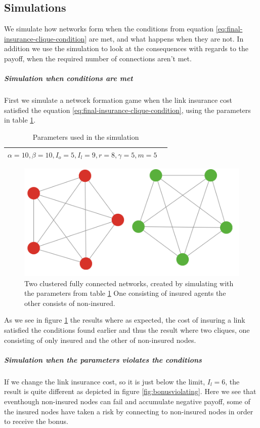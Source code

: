 \subsection{Simulations}
We simulate how networks form when the conditions from equation \ref{eq:final-insurance-clique-condition} are met, and what happens when they are not. In addition we use the simulation to look at the consequences with regards to the payoff, when the required number of connections aren't met. 

\subparagraph{Simulation when conditions are met}
First we simulate a network formation game when the link insurance cost satisfied the equation \ref{eq:final-insurance-clique-condition}, using the parameters in table \ref{tbl:maxdegrevalues}. 
\begin{table}[h]
\centering
\begin{tabular}{lc}
 \hline
  $\alpha=10,
  \beta=10,
  I_{o}=5,
  I_{l}=9,
  r=8,
  \gamma=5,
  m=5
  $
  \\
  \hline
\end{tabular}
\caption{Parameters used in the simulation \label{tbl:maxdegrevalues}}
\end{table}
\begin{figure}[h]
\centering
  \includegraphics[width=0.8\linewidth]{../Figures/BonusGameInsuredClique.png}
  \caption{\label{fig:bonusoptimal} Two clustered fully connected networks, created by simulating with the parameters from table \ref{tbl:maxdegrevalues} One consisting of insured agents the other consists of non-insured. }
\end{figure}
As we see in figure \ref{fig:bonusoptimal} the results where as expected, the cost of insuring a link satisfied the conditions found earlier and thus the result where two cliques, one consisting of only insured and the other of non-insured nodes.

\subparagraph{Simulation when the parameters violates the conditions}
If we change the link insurance cost, so it is just below the limit, $I_{l}=6$, the result is quite different as depicted in figure \ref{fig:bonusviolating}. Here we see that eventhough non-insured nodes can fail and accumulate negative payoff, some of the insured nodes have taken a risk by connecting to non-insured nodes in order to receive the bonus. 


